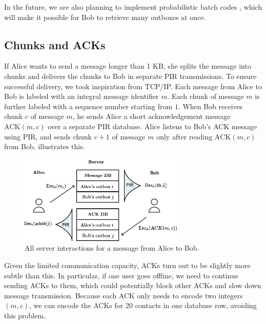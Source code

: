 In the future, we are also planning to implement probabilistic batch codes \cite{angel2018pir}, which will make it possible for Bob to retrieve many outboxes at once.

\subsection{Chunks and ACKs}

If Alice wants to send a message longer than 1 KB, she splits the message into chunks and delivers the chunks to Bob in separate PIR transmissions. To ensure successful delivery, we took inspiration from TCP/IP. Each message from Alice to Bob is labeled with an integral message identifier $m$. Each chunk of message $m$ is further labeled with a sequence number starting from $1$. When Bob receives chunk $c$ of message $m$, he sends Alice a short acknowledgement message $\text{ACK}(m, c)$ over a separate PIR database. Alice listens to Bob's ACK message using PIR, and sends chunk $c + 1$ of message $m$ only after reading $\text{ACK}(m, c)$ from Bob.  illustrates this.

\begin{figure}
    \centering
    \includegraphics[width=0.7\textwidth]{ACK.pdf}
\caption{All server interactions for a message from Alice to Bob. }
\label{fig:pirandacks}
\end{figure}


Given the limited communication capacity, ACKs turn out to be slightly more subtle than this. In particular, if one user goes offline, we need to continue sending ACKs to them, which could potentially block other ACKs and slow down message transmission. Because each ACK only needs to encode two integers $(m, c)$, we can encode the ACKs for 20 contacts in one database row, avoiding this problem.